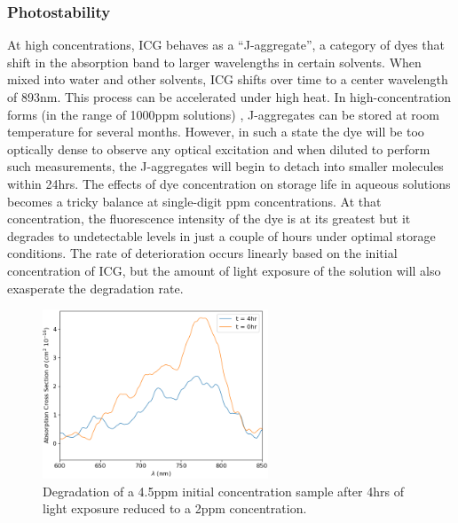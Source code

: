 \subsubsection{ Photostability}
At high concentrations, ICG behaves as a  ``J-aggregate'', a category of dyes that shift in the absorption band to larger wavelengths in certain solvents. When mixed into water and other solvents, ICG shifts over time to a center wavelength of 893nm. This process can be accelerated under high heat. In high-concentration forms (in the range of 1000ppm solutions) \cite{rotermund},  J-aggregates can be stored at room temperature for several months. However, in such a state the dye will be too optically dense to observe any optical excitation and when diluted to perform such measurements, the J-aggregates will begin to detach into smaller molecules within 24hrs.  The effects of dye concentration on storage life in aqueous solutions becomes a tricky balance at single-digit ppm concentrations. At that concentration, the fluorescence intensity of the dye is at its greatest but it degrades to undetectable levels in just a couple of hours under optimal storage conditions\cite{landsman, saxena}. The rate of deterioration occurs linearly based on the initial concentration of ICG\cite{holzer}, but the amount of light exposure of the solution will also exasperate the degradation rate\cite{saxena}.
\begin{figure}[h]
	\centering
	\includegraphics[width=0.6\textwidth]{./Figures/ICG/abc_time.png}
	\caption{Degradation of a 4.5ppm initial concentration sample after 4hrs of light exposure reduced to a 2ppm concentration.}
	\label{fig:icgphoto}
\end{figure}
\clearpage


